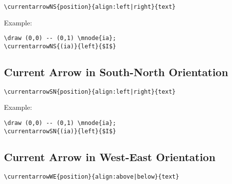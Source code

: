\documentclass[parskip=full]{scrartcl}
\begin{document}
\begin{verbatim}
\currentarrowNS{position}{align:left|right}{text}
\end{verbatim}

Example:\\
\begin{minipage}{0.8\textwidth}
\begin{verbatim}
\draw (0,0) -- (0,1) \mnode{ia};
\currentarrowNS{(ia)}{left}{$I$}
\end{verbatim}
\end{minipage}
\begin{minipage}{0.19\textwidth}
\end{minipage}

\subsection{Current Arrow in South-North Orientation}

\begin{verbatim}
\currentarrowSN{position}{align:left|right}{text}
\end{verbatim}

Example:\\
\begin{minipage}{0.8\textwidth}
\begin{verbatim}
\draw (0,0) -- (0,1) \mnode{ia};
\currentarrowSN{(ia)}{left}{$I$}
\end{verbatim}
\end{minipage}
\begin{minipage}{0.19\textwidth}
\end{minipage}

\subsection{Current Arrow in West-East Orientation}

\begin{verbatim}
\currentarrowWE{position}{align:above|below}{text}
\end{verbatim}
\end{document}
